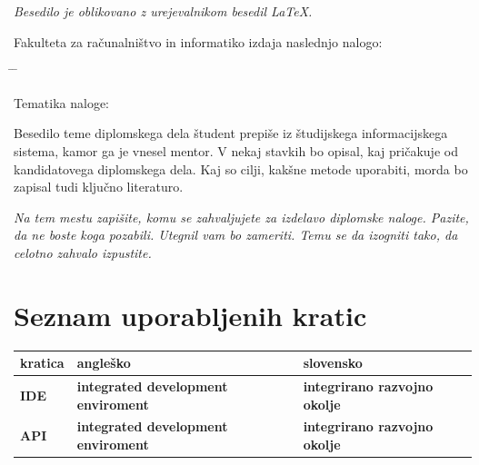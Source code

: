 \documentclass[a4paper, 12pt]{book}
\newcommand{\clearemptydoublepage}{\newpage{\pagestyle{empty}\cleardoublepage}}
\begin{document}
\begin{center}
\mbox{}\vfill
\emph{Besedilo je oblikovano z urejevalnikom besedil \LaTeX.}
\end{center}
\clearemptydoublepage

\thispagestyle{empty}
\vspace*{4cm}

\noindent
Fakulteta za računalništvo in informatiko izdaja naslednjo nalogo:
\medskip
\begin{tabbing}
\hspace{32mm}\= \hspace{6cm} \= \kill

Tematika naloge:
\end{tabbing}
Besedilo teme diplomskega dela študent prepiše iz študijskega informacijskega sistema, kamor ga je vnesel mentor. V nekaj stavkih bo opisal, kaj pričakuje od kandidatovega diplomskega dela. Kaj so cilji, kakšne metode uporabiti, morda bo zapisal tudi ključno literaturo.
\vspace{15mm}

\vspace{2cm}

\clearemptydoublepage

\thispagestyle{empty}\mbox{}\vfill\null\it%
\noindent
Na tem mestu zapišite, komu se zahvaljujete za izdelavo diplomske naloge. Pazite, da ne boste koga pozabili. Utegnil vam bo zameriti. Temu se da izogniti tako, da celotno zahvalo izpustite.
\rm\normalfont

\clearemptydoublepage

\pagestyle{empty}
\def\thepage{}%
\tableofcontents{}

\clearemptydoublepage


\chapter*{Seznam uporabljenih kratic}  %

\noindent\begin{tabular}{p{}|p{}|p{}}    %
  {\bf kratica} & {\bf angleško} & {\bf slovensko} \\ \hline
  {\bf IDE} & {\bf integrated development enviroment} & {\bf integrirano razvojno okolje} \\ \hline
  {\bf API} & {\bf integrated development enviroment} & {\bf integrirano razvojno okolje} \\ \hline
\end{tabular}
\end{document}

